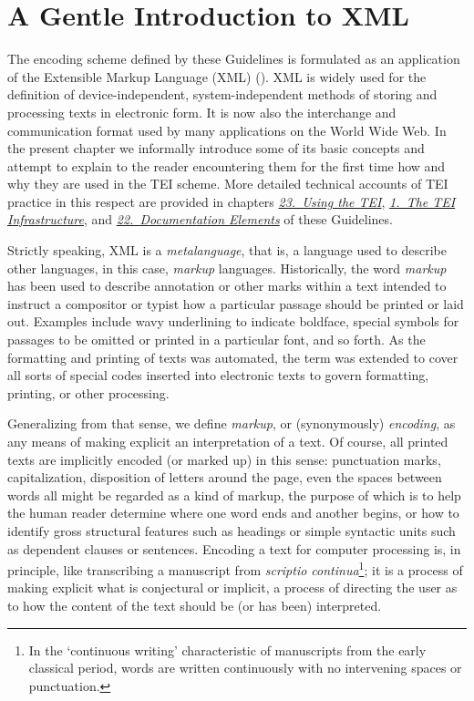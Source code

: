 
\section[{A Gentle Introduction to XML}]{A Gentle Introduction to XML}\label{SG}\par
The encoding scheme defined by these Guidelines is formulated as an application of the Extensible Markup Language (XML) (\cite{XMLREC}). XML is widely used for the definition of device-independent, system-independent methods of storing and processing texts in electronic form. It is now also the interchange and communication format used by many applications on the World Wide Web. In the present chapter we informally introduce some of its basic concepts and attempt to explain to the reader encountering them for the first time how and why they are used in the TEI scheme. More detailed technical accounts of TEI practice in this respect are provided in chapters \textit{\hyperref[USE]{23.\ Using the TEI}}, \textit{\hyperref[ST]{1.\ The TEI Infrastructure}}, and \textit{\hyperref[TD]{22.\ Documentation Elements}} of these Guidelines.\par
Strictly speaking, XML is a \textit{metalanguage}, that is, a language used to describe other languages, in this case, \textit{markup} languages. Historically, the word \textit{markup} has been used to describe annotation or other marks within a text intended to instruct a compositor or typist how a particular passage should be printed or laid out. Examples include wavy underlining to indicate boldface, special symbols for passages to be omitted or printed in a particular font, and so forth. As the formatting and printing of texts was automated, the term was extended to cover all sorts of special codes inserted into electronic texts to govern formatting, printing, or other processing.\par
Generalizing from that sense, we define \textit{markup}, or (synonymously) \textit{encoding}, as any means of making explicit an interpretation of a text. Of course, all printed texts are implicitly encoded (or marked up) in this sense: punctuation marks, capitalization, disposition of letters around the page, even the spaces between words all might be regarded as a kind of markup, the purpose of which is to help the human reader determine where one word ends and another begins, or how to identify gross structural features such as headings or simple syntactic units such as dependent clauses or sentences. Encoding a text for computer processing is, in principle, like transcribing a manuscript from \textit{scriptio continua}\footnote{In the ‘continuous writing’ characteristic of manuscripts from the early classical period, words are written continuously with no intervening spaces or punctuation.}; it is a process of making explicit what is conjectural or implicit, a process of directing the user as to how the content of the text should be (or has been) interpreted.\par
